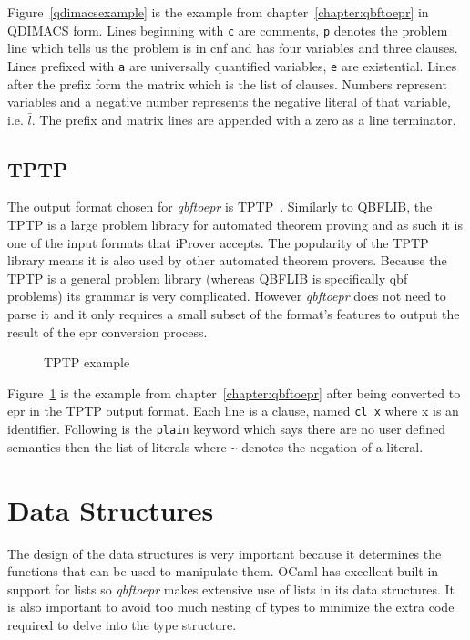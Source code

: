 Figure~\ref{qdimacsexample} is the example from chapter~\ref{chapter:qbftoepr} in QDIMACS form. Lines beginning with \texttt{c} are comments, \texttt{p} denotes the problem line which tells us the problem is in \gls{cnf} and has four variables and three clauses. Lines prefixed with \texttt{a} are universally quantified variables, \texttt{e} are existential. Lines after the prefix form the matrix which is the list of clauses. Numbers represent variables and a negative number represents the negative literal of that variable, i.e. $\bar{l}$. The prefix and matrix lines are appended with a zero as a line terminator.

\subsection{TPTP}
The output format chosen for \textit{qbftoepr} is TPTP~\cite{tptp}. Similarly to QBFLIB, the TPTP is a large problem library for automated theorem proving and as such it is one of the input formats that iProver accepts. The popularity of the TPTP library means it is also used by other automated theorem provers. Because the TPTP is a general problem library (whereas QBFLIB is specifically \gls{qbf} problems) its grammar is very complicated. However \textit{qbftoepr} does not need to parse it and it only requires a small subset of the format's features to output the result of the \gls{epr} conversion process.

\begin{figure}[H]
\caption{TPTP example}
\label{tptpexample}
\begin{CenteredBox}

\end{CenteredBox}
\end{figure}

Figure~\ref{tptpexample} is the example from chapter~\ref{chapter:qbftoepr} after being converted to \gls{epr} in the TPTP output format. Each line is a clause, named \texttt{cl\_x} where x is an identifier. Following is the \texttt{plain} keyword which says there are no user defined semantics then the list of literals where \texttt{\textasciitilde} denotes the negation of a literal.

\section{Data Structures} \label{datastructures}
The design of the data structures is very important because it determines the functions that can be used to manipulate them. OCaml has excellent built in support for lists so \textit{qbftoepr} makes extensive use of lists in its data structures. It is also important to avoid too much nesting of types to minimize the extra code required to delve into the type structure.

